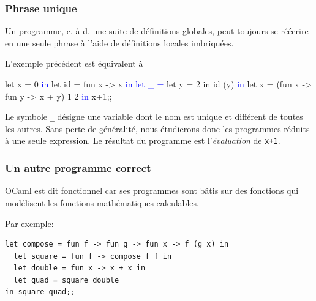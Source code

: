 %
\begin{frame}[containsverbatim]
\frametitle{Phrase unique}

Un programme, c.-à-d. une suite de définitions globales, peut toujours
se réécrire en une seule phrase à l'aide de définitions locales
imbriquées.

\bigskip

L'exemple précédent est équivalent à
\begin{semiverbatim}
let x = 0 \textcolor{blue}{in}
  let id = fun x -> x \textcolor{blue}{in}
  \textcolor{blue}{let _ =} let y = 2 in id (y) \textcolor{blue}{in}
  let x = (fun x -> fun y -> x + y) 1 2
\textcolor{blue}{in} x+1;;
\end{semiverbatim}
Le symbole \verb|_| désigne une variable dont le nom est unique et
différent de toutes les autres. Sans perte de généralité, nous
étudierons donc les programmes réduits à une seule expression. Le
résultat du programme est l'\emph{évaluation} de \verb|x+1|.

\end{frame}

%
\begin{frame}[containsverbatim]
\frametitle{Un autre programme correct}
\label{un_autre_programme}

OCaml est dit fonctionnel car ses programmes sont bâtis sur des
fonctions qui modélisent les fonctions mathématiques calculables.

\bigskip

Par exemple:
{\small
\begin{verbatim}
let compose = fun f -> fun g -> fun x -> f (g x) in
  let square = fun f -> compose f f in
  let double = fun x -> x + x in
  let quad = square double
in square quad;;
\end{verbatim}
}

\end{frame}

